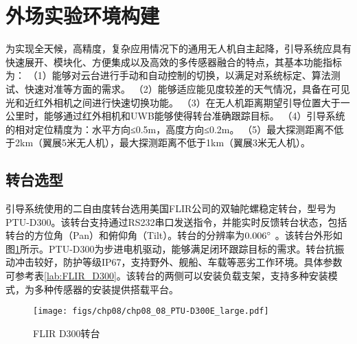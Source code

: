 \section{外场实验环境构建}
为实现全天候，高精度，复杂应用情况下的通用无人机自主起降，引导系统应具有快速展开、模块化、方便集成以及高效的多传感器融合的特点，其基本功能指标为：
（1）能够对云台进行手动和自动控制的切换，以满足对系统标定、算法测试、快速对准等方面的需求。
（2）能够适应能见度较差的天气情况，具备在可见光和近红外相机之间进行快速切换功能。
（3）在无人机距离期望引导位置大于一公里时，能够通过红外相机和UWB能够使得转台准确跟踪目标。
（4）引导系统的相对定位精度为：水平方向≤0.5m，高度方向≤0.2m。
（5）最大探测距离不低于2km（翼展5米无人机），最大探测距离不低于1km（翼展3米无人机）。

\subsection{转台选型}
引导系统使用的二自由度转台选用美国FLIR公司的双轴陀螺稳定转台，型号为PTU-D300。该转台支持通过RS232串口发送指令，并能实时反馈转台状态，包括转台的方位角（Pan）和俯仰角（Tilt）。转台的分辨率为$0.006\degree$ 。该转台外形如图\ref{fig:chp08_08_PTU-D300E_large}所示。PTU-D300为步进电机驱动，能够满足闭环跟踪目标的需求。转台抗振动冲击较好，防护等级IP67，支持野外、舰船、车载等恶劣工作环境。具体参数可参考表\ref{lab:FLIR_D300}。该转台的两侧可以安装负载支架，支持多种安装模式，为多种传感器的安装提供搭载平台。
\begin{figure}[!ht]
	\centering
	\texttt{[image: figs/chp08/chp08\_08\_PTU-D300E\_large.pdf]}	
	\caption{FLIR D300转台}
	\label{fig:chp08_08_PTU-D300E_large}
\end{figure}
